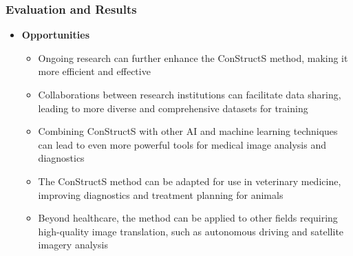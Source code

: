 \documentclass[aspectratio=169, lecture, amberg]{OTHAWbeamer}
\begin{document}
\begin{frame}
    \frametitle{Evaluation and Results}
    \vspace{0.2cm}
    \begin{itemize}
        \item \textbf{Opportunities}
        \begin{itemize}
            \item <1-> Ongoing research can further enhance the ConStructS method, making it more efficient and effective
            \vspace{0.2cm}
            \item <2-> Collaborations between research institutions can facilitate data sharing, leading to more diverse and comprehensive datasets for training
            \vspace{0.2cm}
            \item <3-> Combining ConStructS with other AI and machine learning techniques can lead to even more powerful tools for medical image analysis and diagnostics
            \vspace{0.2cm}
            \item <4-> The ConStructS method can be adapted for use in veterinary medicine, improving diagnostics and treatment planning for animals
            \vspace{0.2cm}
            \item <5-> Beyond healthcare, the method can be applied to other fields requiring high-quality image translation, such as autonomous driving and satellite imagery analysis
        \end{itemize}
    \end{itemize}
    
\end{frame}
\end{document}

